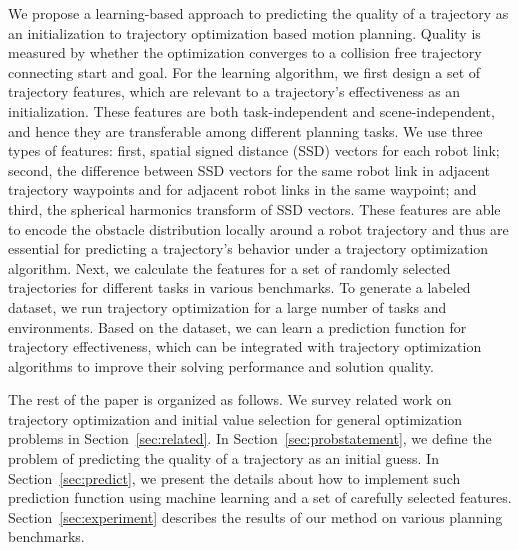 \documentclass[letterpaper, 10 pt, conference]{ieeeconf}  %
\begin{document}
We propose a learning-based approach to predicting the quality of a trajectory as an initialization to trajectory optimization based motion planning. Quality is measured by whether the optimization converges to a collision free trajectory connecting start and goal. 
For the learning algorithm, we first design a set of trajectory features, which are relevant to a trajectory's effectiveness as an initialization. These features are both task-independent and scene-independent, and hence they are transferable among different planning tasks. We use three types of features: first, spatial signed distance (SSD) vectors for each robot link; second, the difference between SSD vectors for the same robot link in adjacent trajectory waypoints and for adjacent robot links in the same waypoint; and third, the spherical harmonics transform of SSD vectors. These features are able to encode the obstacle distribution locally around a robot trajectory and thus are essential for predicting a trajectory's behavior under a trajectory optimization algorithm. Next, we calculate the features for a set of randomly selected trajectories for different tasks in various benchmarks. To generate a labeled dataset, we run trajectory optimization for a large number of tasks and environments. Based on the dataset, we can learn a prediction function for trajectory effectiveness, which can be integrated with trajectory optimization algorithms to improve their solving performance and solution quality.

The rest of the paper is organized as follows. We survey related work on trajectory optimization and initial value selection for general optimization problems in Section~\ref{sec:related}. In Section~\ref{sec:probstatement}, we define the problem of predicting the quality of a trajectory as an initial guess. In Section~\ref{sec:predict}, we present the details about how to implement such prediction function using machine learning and a set of carefully selected features. Section~\ref{sec:experiment} describes the results of our method on various planning benchmarks.
\end{document}
